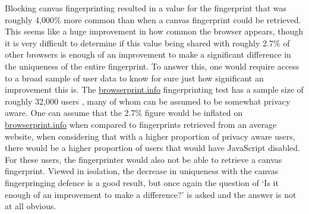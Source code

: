 Blocking canvas fingerprinting resulted in a value for the fingerprint that was roughly 4,000\% more common than when a canvas fingerprint could be retrieved.
This seems like a huge improvement in how common the browser appears, though it is very difficult to determine if this value being shared with roughly 2.7\% of other browsers is enough of an improvement to make a significant difference in the uniqueness of the entire fingerprint.
To answer this, one would require access to a broad sample of user data to know for sure just how significant an improvement this is.
The \url{browserprint.info} fingerprinting test has a sample size of roughly 32,000 users \citep{browserprint}, many of whom can be assumed to be somewhat privacy aware.
One can assume that the 2.7\% figure would be inflated on \url{browserprint.info} when compared to fingerprints retrieved from an average website, when considering that with a higher proportion of privacy aware users, there would be a higher proportion of users that would have JavaScript disabled.
For these users, the fingerprinter would also not be able to retrieve a canvas fingerprint.
Viewed in isolation, the decrease in uniqueness with the canvas fingerpringing defence is a good result, but once again the question of `Is it enough of an improvement to make a difference?' is asked and the answer is not at all obvious.

